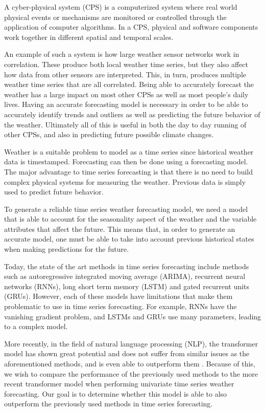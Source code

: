 \label{sec:intro}
A cyber-physical system (CPS) is a computerized system where real world physical events or mechanisms are monitored or controlled through the application of computer algorithms.
In a CPS, physical and software components work together in different spatial and temporal scales.

An example of such a system is how large weather sensor networks work in correlation. These produce both local weather time series, but they also affect how data from other sensors are interpreted. This, in turn, produces multiple weather time series that are all correlated. Being able to accurately forecast the weather has a large impact on most other CPSs as well as most people's daily lives. Having an accurate forecasting model is necessary in order to be able to accurately identify trends and outliers as well as predicting the future behavior of the weather. Ultimately all of this is useful in both the day to day running of other CPSs, and also in predicting future possible climate changes.\cite{alurPrinciplesCyberphysicalSystems2015} 

Weather is a suitable problem to model as a time series since historical weather data is timestamped.
Forecasting can then be done using a forecasting model.
The major advantage to time series forecasting is that there is no need to build complex physical systems for measuring the weather. 
Previous data is simply used to predict future behavior.

To generate a reliable time series weather forecasting model, we need a model that is able to account for the seasonality aspect of the weather and the variable attributes that affect the future. 
This means that, in order to generate an accurate model, one must be able to take into account previous historical states when making predictions for the future. 

Today, the state of the art methods in time series forecasting include methods such as autoregressive integrated moving average (ARIMA), recurrent neural networks (RNNs), long short term memory (LSTM) and gated recurrent units
(GRUs).
However, each of these models have limitations that make them problematic to use in time series forecasting.
For example, RNNs have the vanishing gradient problem, and LSTMs and GRUs use many parameters, leading to a complex model.

More recently, in the field of natural language processing (NLP), the transformer model has shown great potential and does not suffer from similar issues as the aforementioned methods, and is even able to outperform them \cite{AttentionIsAllYouNeed}.
Because of this, we wish to compare the performance of the previously used methods to the more recent transformer model when performing univariate time series weather forecasting. Our goal is to determine whether this model is able to also outperform the previously used methods in time series forecasting.

